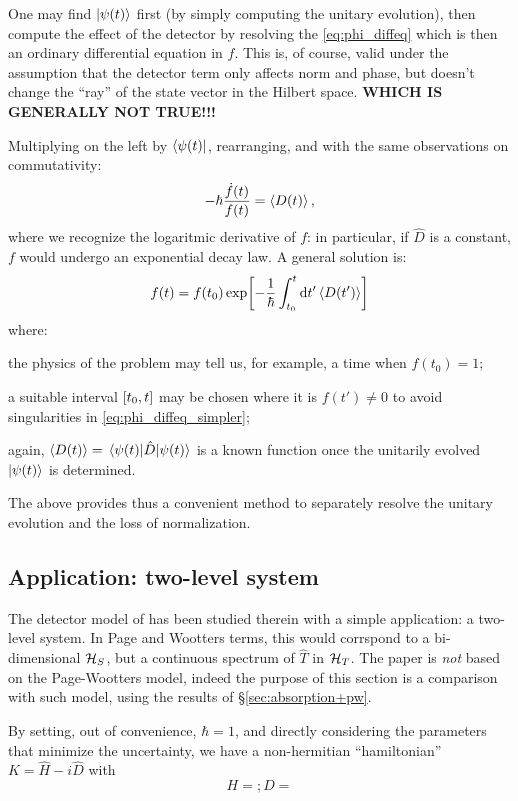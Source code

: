 One may find $\ket{\psi(t)}$ first (by simply computing the unitary evolution),
then compute the effect of the detector by resolving the \eqref{eq:phi_diffeq}
which is then an ordinary differential equation in $f$. This is, of course, valid
under the assumption that the detector term only affects norm and phase,
but doesn't change the ``ray'' of the state vector in the Hilbert space.
{\color{blue}\textbf{WHICH IS GENERALLY NOT TRUE!!!}}

Multiplying on the left by $\bra{\psi(t)}$, rearranging, and with the same observations
on commutativity:
\begin{equation}\label{eq:phi_diffeq_simpler}
  -\hbar\frac{\dot{f}(t)}{f(t)} = \ev{D(t)} \text{,}
\end{equation}
where we recognize the logaritmic derivative of $f$: in particular,
if $\hat{D}$ is a constant, $f$ would undergo an exponential decay law.
A general solution is:
\begin{equation}\label{eq:f-evol}
  f(t) = f(t_0) \exp[ -\frac{1}{\hbar} \int_{t_0}^{t} \dd{t'} \ev{D(t')} ]
\end{equation}
where:
\begin{enumerate*}[label=\emph{\alph*})]
  \item
    the physics of the problem may tell us, for example, a time when $f(t_0) = 1$;
  \item
    a suitable interval $\qty[t_0, t]$ may be chosen where it is $f(t') \ne 0$
    to avoid singularities in \eqref{eq:phi_diffeq_simpler};
  \item
    again, $\ev{D(t)} = \mel{\psi(t)}{\hat{D}}{\psi(t)}$ is a known function
    once the unitarily evolved $\ket{\psi(t)}$ is determined.
\end{enumerate*}

The above provides thus a convenient method to separately resolve
the unitary evolution and the loss of normalization.

\subsection{Application: two-level system}

The detector model of \cite{RuschhauptAbsorption} has been studied therein
with a simple application: a two-level system. In Page and Wootters terms,
this would corrspond to a bi-dimensional $\mathcal{H}_S$, but a continuous
spectrum of $\hat{T}$ in $\mathcal{H}_T$. The paper is \emph{not} based on
the Page-Wootters model, indeed the purpose of this section is a comparison
with such model, using the results of \S \ref{sec:absorption+pw}.

By setting, out of convenience, $\hbar = 1$, and directly considering the parameters
that minimize the uncertainty, we have a non-hermitian ``hamiltonian''
$K = \hat{H} - i\hat{D}$ with
\begin{equation}
  H = ; D =
\end{equation}